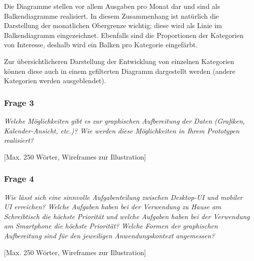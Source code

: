 Die Diagramme stellen vor allem Ausgaben pro Monat dar und sind als Balkendiagramme realisiert.
In diesem Zusammenhang ist nat\"urlich die Darstellung der monatlichen Obergrenze wichtig;
diese wird als Linie im Balkendiagramm eingezeichnet. Ebenfalls sind die Proportionen der Kategorien
von Interesse, deshalb wird ein Balken pro Kategorie eingef\"arbt.

Zur \"ubersichtlicheren Darstellung der Entwicklung von einzelnen Kategorien k\"onnen
diese auch in einem gefilterten Diagramm dargestellt werden (andere Kategorien werden
ausgeblendet).



\subsubsection{Frage 3}

\emph{Welche Möglichkeiten gibt es zur graphischen Aufbereitung der Daten (Grafiken, Kalender-Ansicht, etc.)? Wie werden diese Möglichkeiten in Ihrem Prototypen realisiert?}

\vspace{2mm}



[Max. 250 Wörter, Wireframes zur Illustration]



\subsubsection{Frage 4}

\emph{Wie lässt sich eine sinnvolle Aufgabenteilung zwischen Desktop-UI und mobiler UI erreichen? Welche Aufgaben haben bei der Verwendung zu Hause am Schreibtisch die höchste Priorität und welche Aufgaben haben bei der Verwendung am Smartphone die höchste Priorität? Welche Formen der graphischen Aufbereitung sind für den jeweiligen Anwendungskontext angemessen?}

\vspace{2mm}



[Max. 250 Wörter, Wireframes zur Illustration]

